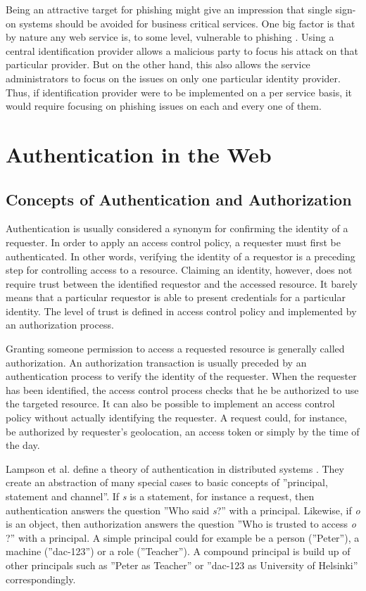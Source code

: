 \documentclass{tktltiki}
\begin{document}
    Being an attractive target for phishing might give an impression that single sign-on systems should be avoided for business critical services. One big factor is that by nature any web service is, to some level, vulnerable to phishing \cite{why_phishing_works_06}. Using a central identification provider allows a malicious party to focus his attack on that particular provider. But on the other hand, this also allows the service administrators to focus on the issues on only one particular identity provider. Thus, if identification provider were to be implemented on a per service basis, it would require focusing on phishing issues on each and every one of them.

      
    
\section{Authentication in the Web}



\subsection{Concepts of Authentication and Authorization}

    Authentication is usually considered a synonym for confirming the identity of a requester. In order to apply an access control policy, a requester must first be authenticated. In other words, verifying the identity of a requestor is a preceding step for controlling access to a resource. Claiming an identity, however, does not require trust between the identified requestor and the accessed resource. It barely means that a particular requestor is able to present credentials for a particular identity. The level of trust is defined in access control policy and implemented by an authorization process.

  Granting someone permission to access a requested resource is generally called authorization. An authorization transaction is usually preceded by an authentication process to verify the identity of the requester. When the requester has been identified, the access control process checks that he be authorized to use the targeted resource. It can also be possible to implement an access control policy without actually identifying the requester. A request could, for instance, be authorized by requester's geolocation, an access token or simply by the time of the day.
          
  Lampson et al. define a theory of authentication in distributed systems
\cite{lampson_distributed_1992}. They create an abstraction of many special
cases to basic concepts of ''principal, statement and channel''. If \emph{s}
is a statement, for instance a request, then authentication answers the
question ''Who said \emph{s}?'' with a principal. Likewise, if \emph{o} is an
object, then authorization answers the question ''Who is trusted to access
\emph{o} ?'' with a principal. A simple principal could for example be a
person (''Peter''), a machine (''dac-123'') or a role (''Teacher''). A
compound principal is build up of other principals such as ''Peter as
Teacher'' or ''dac-123 as University of Helsinki'' correspondingly.
\end{document}
